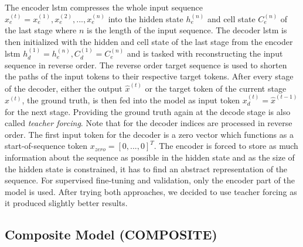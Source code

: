 The encoder \gls{lstm} compresses the whole input sequence $x_e^{(t)} = x_e^{(1)}, x_e^{(2)}, ..., x_e^{(n)}$ into the hidden state $h_e^{(n)}$ and cell state $C_e^{(n)}$ of the last stage where $n$ is the length of the input sequence. The decoder \gls{lstm} is then initialized with the hidden and cell state of the last stage from the encoder \gls{lstm} $h_d^{(1)} = h_e^{(n)}, C_d^{(1)} = C_e^{(n)}$ and is tasked with reconstructing the input sequence in reverse order. The reverse order target sequence is used to shorten the paths of the input tokens to their respective target tokens. After every stage of the decoder, either the output $\hat{x}^{(t)}$ or the target token of the current stage $x^{(t)}$, the ground truth, is then fed into the model as input token $x_d^{(t)} = \hat{x}^{(t-1)}$ for the next stage. Providing the ground truth again at the decode stage is also called \textit{teacher forcing}. Note that for the decoder indices are processed in reverse order. The first input token for the decoder is a zero vector which functions as a start-of-sequence token $x_{zero} = [0, ..., 0]^T$. The encoder is forced to store as much information about the sequence as possible in the hidden state and as the size of the hidden state is constrained, it has to find an abstract representation of the sequence. For supervised fine-tuning and validation, only the encoder part of the model is used. After trying both approaches, we decided to use teacher forcing as it produced slightly better results.

\FloatBarrier

\subsection{Composite Model (COMPOSITE)} \label{sec:experiments:lstm:composite}

